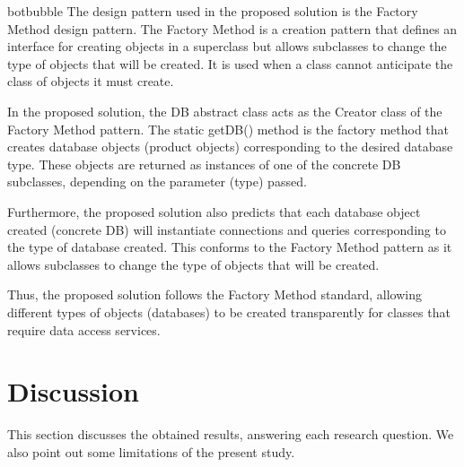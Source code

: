 \begin{chatout}{botbubble}{}
The design pattern used in the proposed solution is the Factory Method design pattern. The Factory Method is a creation pattern that defines an interface for creating objects in a superclass but allows subclasses to change the type of objects that will be created. It is used when a class cannot anticipate the class of objects it must create.

In the proposed solution, the DB abstract class acts as the Creator class of the Factory Method pattern. The static getDB() method is the factory method that creates database objects (product objects) corresponding to the desired database type. These objects are returned as instances of one of the concrete DB subclasses, depending on the parameter (type) passed.

Furthermore, the proposed solution also predicts that each database object created (concrete DB) will instantiate connections and queries corresponding to the type of database created. This conforms to the Factory Method pattern as it allows subclasses to change the type of objects that will be created.

Thus, the proposed solution follows the Factory Method standard, allowing different types of objects (databases) to be created transparently for classes that require data access services.
\end{chatout}    

\section{Discussion}\label{DiscussionPreliminaryStudy}

This section discusses the obtained results, answering each research question. We also point out some limitations of the present study.


